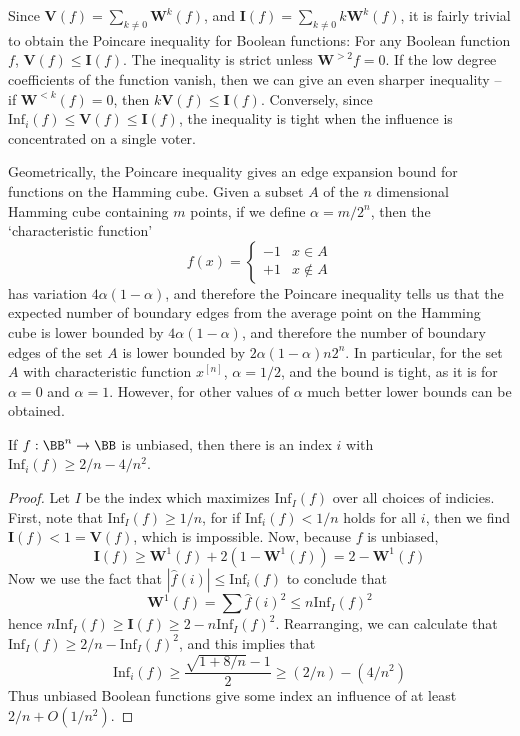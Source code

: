 Since $\mathbf{V}(f) = \sum_{k \neq 0} \mathbf{W}^k(f)$, and $\mathbf{I}(f) = \sum_{k \neq 0} k\mathbf{W}^k(f)$, it is fairly trivial to obtain the Poincare inequality for Boolean functions: For any Boolean function $f$, $\mathbf{V}(f) \leq \mathbf{I}(f)$. The inequality is strict unless $\mathbf{W}^{> 2} f = 0$. If the low degree coefficients of the function vanish, then we can give an even sharper inequality -- if $\mathbf{W}^{< k}(f) = 0$, then $k \mathbf{V}(f) \leq \mathbf{I}(f)$. Conversely, since $\text{Inf}_i(f) \leq \mathbf{V}(f) \leq \mathbf{I}(f)$, the inequality is tight when the influence is concentrated on a single voter.

\begin{example}
    Geometrically, the Poincare inequality gives an edge expansion bound for functions on the Hamming cube. Given a subset $A$ of the $n$ dimensional Hamming cube containing $m$ points, if we define $\alpha = m/2^n$, then the `characteristic function'
    \[ f(x) = \begin{cases} -1 & x \in A \\ +1 & x \not \in A \end{cases} \]
    has variation $4 \alpha (1 - \alpha)$, and therefore the Poincare inequality tells us that the expected number of boundary edges from the average point on the Hamming cube is lower bounded by $4 \alpha (1 - \alpha)$, and therefore the number of boundary edges of the set $A$ is lower bounded by $2 \alpha (1 - \alpha) n 2^n$. In particular, for the set $A$ with characteristic function $x^{[n]}$, $\alpha = 1/2$, and the bound is tight, as it is for $\alpha = 0$ and $\alpha = 1$. However, for other values of $\alpha$ much better lower bounds can be obtained.
\end{example}

\begin{lemma}
    If $f: \BB^n \to \BB$ is unbiased, then there is an index $i$ with $\text{Inf}_i(f) \geq 2/n - 4/n^2$.
\end{lemma}
\begin{proof}
    Let $I$ be the index which maximizes $\text{Inf}_I(f)$ over all choices of indicies. First, note that $\text{Inf}_I(f) \geq 1/n$, for if $\text{Inf}_i(f) < 1/n$ holds for all $i$, then we find $\mathbf{I}(f) < 1 = \mathbf{V}(f)$, which is impossible. Now, because $f$ is unbiased,
    \[ \mathbf{I}(f) \geq \mathbf{W}^1(f) + 2(1 - \mathbf{W}^1(f)) = 2 - \mathbf{W}^1(f) \]
    Now we use the fact that $|\widehat{f}(i)| \leq \text{Inf}_i(f)$ to conclude that
    \[ \mathbf{W}^1(f) = \sum \widehat{f}(i)^2 \leq n \text{Inf}_I(f)^2 \]
    hence $n \text{Inf}_I(f) \geq \mathbf{I}(f) \geq 2 - n \text{Inf}_I(f)^2$. Rearranging, we can calculate that $\text{Inf}_I(f) \geq 2/n - \text{Inf}_I(f)^2$, and this implies that
    \[ \text{Inf}_i(f) \geq \frac{\sqrt{1 + 8/n} - 1}{2} \geq (2/n) - (4/n^2) \]
    Thus unbiased Boolean functions give some index an influence of at least $2/n + O(1/n^2)$.
\end{proof}

